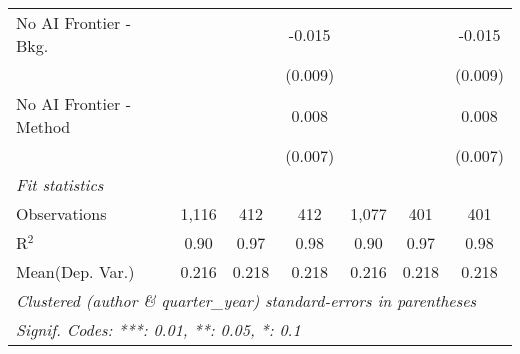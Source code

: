 \begin{tabular}{lcccccc}
   No AI Frontier - Bkg.   &         &              & -0.015       &         &              & -0.015\\   
                           &         &              & (0.009)      &         &              & (0.009)\\   
   No AI Frontier - Method &         &              & 0.008        &         &              & 0.008\\   
                           &         &              & (0.007)      &         &              & (0.007)\\   
   \midrule
   \emph{Fit statistics}\\
   Observations            & 1,116   & 412          & 412          & 1,077   & 401          & 401\\  
   R$^2$                   & 0.90    & 0.97         & 0.98         & 0.90    & 0.97         & 0.98\\  
Mean(Dep. Var.) & 0.216 & 0.218 & 0.218 & 0.216 & 0.218 & 0.218 \\
   \midrule \midrule
   \multicolumn{7}{l}{\emph{Clustered (author \& quarter\_year) standard-errors in parentheses}}\\
   \multicolumn{7}{l}{\emph{Signif. Codes: ***: 0.01, **: 0.05, *: 0.1}}\\
\end{tabular}
\par\endgroup
